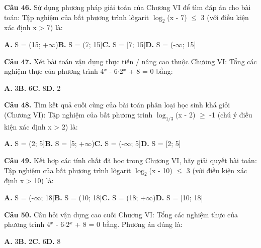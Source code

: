 \documentclass[11pt,a4paper]{article}
\begin{document}
\textbf{\color{primary} Câu 46.} Sử dụng phương pháp giải toán của Chương VI để tìm đáp án cho bài toán: Tập nghiệm của bất phương trình lôgarit $\log_2$(x - 7) $\le$ 3 (với điều kiện xác định x > 7) là:\par
\hspace*{1.5em}\textbf{A.} S = (15; +$\infty$)\quad\quad \textbf{B.} S = (7; 15]\quad\quad \textbf{C.} S = [7; 15]\quad\quad \textbf{D.} S = (-$\infty$; 15]\par\vspace{2pt}
\textbf{\color{primary} Câu 47.} Xét bài toán vận dụng thực tiễn / nâng cao thuộc Chương VI: Tổng các nghiệm thực của phương trình 4$^{x}$ - 6$\cdot$2$^{x}$ + 8 = 0 bằng:\par
\hspace*{1.5em}\textbf{A.} 3\quad\quad \textbf{B.} 6\quad\quad \textbf{C.} 8\quad\quad \textbf{D.} 2\par\vspace{2pt}
\textbf{\color{primary} Câu 48.} Tìm kết quả cuối cùng của bài toán phân loại học sinh khá giỏi (Chương VI): Tập nghiệm của bất phương trình $\log_{1/3}$(x - 2) $\ge$ -1 (chú ý điều kiện xác định x > 2) là:\par
\hspace*{1.5em}\textbf{A.} S = (2; 5]\quad\quad \textbf{B.} S = [5; +$\infty$)\quad\quad \textbf{C.} S = (-$\infty$; 5]\quad\quad \textbf{D.} S = [2; 5]\par\vspace{2pt}
\textbf{\color{primary} Câu 49.} Kết hợp các tính chất đã học trong Chương VI, hãy giải quyết bài toán: Tập nghiệm của bất phương trình lôgarit $\log_2$(x - 10) $\le$ 3 (với điều kiện xác định x > 10) là:\par
\hspace*{1.5em}\textbf{A.} S = (-$\infty$; 18]\quad\quad \textbf{B.} S = (10; 18]\quad\quad \textbf{C.} S = (18; +$\infty$)\quad\quad \textbf{D.} S = [10; 18]\par\vspace{2pt}
\textbf{\color{primary} Câu 50.} Câu hỏi vận dụng cao cuối Chương VI: Tổng các nghiệm thực của phương trình 4$^{x}$ - 6$\cdot$2$^{x}$ + 8 = 0 bằng. Phương án đúng là:\par
\hspace*{1.5em}\textbf{A.} 3\quad\quad \textbf{B.} 2\quad\quad \textbf{C.} 6\quad\quad \textbf{D.} 8\par\vspace{2pt}
\end{document}
